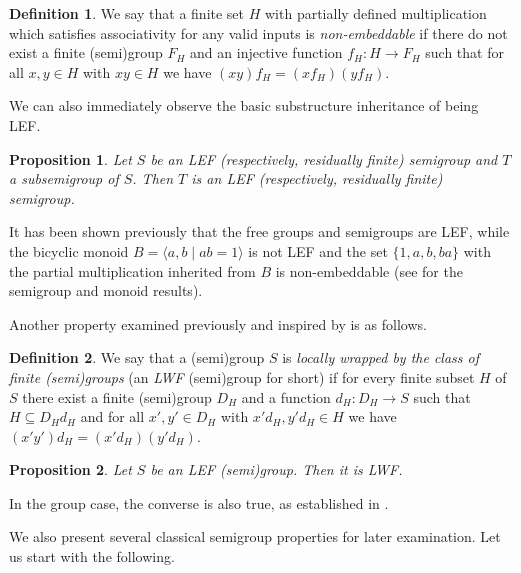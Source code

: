 \documentclass{article}
\newtheorem{proposition}{Proposition}
\theoremstyle{definition}
\newtheorem{definition}{Definition}
\begin{document}
\begin{definition}\label{def_nemb}
We say that a finite set $H$ with partially defined multiplication which satisfies associativity for any valid inputs is {\em non-embeddable} if there do not exist a finite (semi)group $F_H$ and an injective function $f_H: H \rightarrow F_H$ such that for all  $x,y \in H$ with $xy \in H$ we have $(xy)f_H = (xf_H)(yf_H)$.
\end{definition}

We can also immediately observe the basic substructure inheritance of being LEF.

\begin{proposition}\label{prop_sublef}\emph{\cite[Proposition 5.1]{K23}}
Let $S$ be an LEF (respectively, residually ﬁnite) semigroup and $T$ a subsemigroup of $S$. Then $T$ is an LEF (respectively, residually ﬁnite) semigroup.
\end{proposition}

It has been shown previously that the free groups and semigroups are LEF, while the bicyclic monoid $B = \langle a,b \mid ab=1\rangle$ is not LEF and the set $\{1,a,b,ba\}$ with the partial multiplication inherited from $B$ is non-embeddable (see \cite[Examples 1.5 and 1.7]{K23} for the semigroup and monoid results).

Another property examined previously and inspired by \cite{GV} is as follows.

\begin{definition}\label{def_lwf}{\cite[Definition 3]{K24}}
We say that a (semi)group $S$ is {\em locally wrapped by the class of finite (semi)groups} (an {\em LWF} (semi)group for short) if for every finite subset $H$ of $S$ there exist a finite (semi)group $D_H$ and a function $d_H: D_H \rightarrow S$ such that $H \subseteq D_H d_H$ and for all $x', y' \in D_H$ with $x'd_H,y' d_H \in H$ we have $(x'y')d_H = (x'd_H)(y'd_H)$.
\end{definition}

\begin{proposition}\label{prop_lefislwf}\emph{\cite[Proposition 3]{K24}}
Let $S$ be an LEF (semi)group. Then it is LWF.
\end{proposition}

In the group case, the converse is also true, as established in \cite[Corollary 25]{K24}.

We also present several classical semigroup properties for later examination. Let us start with the following.
\end{document}
